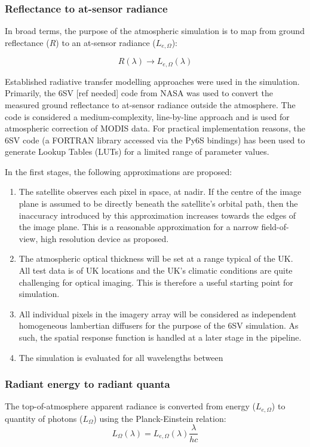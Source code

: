 \documentclass[10pt,a4paper,final,twocolumn]{article}
\begin{document}
\subsubsection{Reflectance to at-sensor radiance}
In broad terms, the purpose of the atmospheric simulation is to map from ground reflectance ($R$) to an at-sensor radiance ($L_{e, \Omega}$):

\begin{equation}
R(\lambda) \rightarrow L_{e, \Omega} (\lambda)
\end{equation}

Established radiative transfer modelling approaches were used in the simulation. Primarily, the 6SV [ref needed] code from NASA was used to convert the measured ground reflectance to at-sensor radiance outside the atmosphere. The code is considered a medium-complexity, line-by-line approach and is used for atmospheric correction of MODIS data. For practical implementation reasons, the 6SV code (a FORTRAN library accessed via the Py6S bindings) has been used to generate Lookup Tables (LUTs) for a limited range of parameter values.

In the first stages, the following approximations are proposed:
\begin{enumerate}
\item The satellite observes each pixel in space, at nadir. If the centre of the image plane is assumed to be directly beneath the satellite's orbital path, then the inaccuracy introduced by this approximation increases towards the edges of the image plane. This is a reasonable approximation for a narrow field-of-view, high resolution device as proposed. 
\item The atmospheric optical thickness will be set at a range typical of the UK. All test data is of UK locations and the UK's climatic conditions are quite challenging for optical imaging. This is therefore a useful starting point for simulation.
\item All individual pixels in the imagery array will be considered as independent homogeneous lambertian diffusers for the purpose of the 6SV simulation. As such, the spatial response function is handled at a later stage in the pipeline.
\item The simulation is evaluated for all wavelengths between 
\end{enumerate}

\subsubsection{Radiant energy to radiant quanta}
The top-of-atmosphere apparent radiance is converted from energy ($L_{e,\Omega}$) to quantity of photons ($L_{\Omega}$) using the Planck-Einstein relation:
\begin{equation}
L_{\Omega}(\lambda) = L_{e,\Omega}(\lambda)\frac{\lambda}{hc}
\end{equation}
\end{document}
